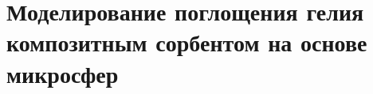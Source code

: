 %
%
%
%
%
%
%
%
%
%







\section{Моделирование поглощения гелия композитным сорбентом на основе микросфер}
\label{section_2_4}

